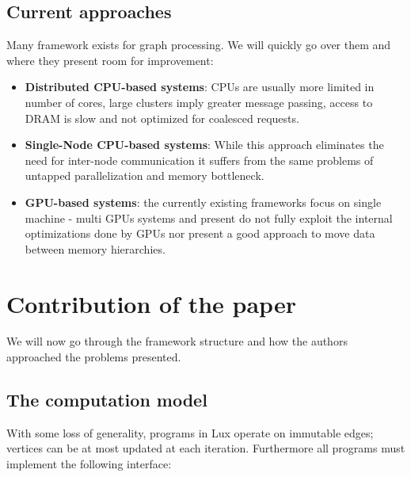 \documentclass[]{article}
\begin{document}
\subsection{Current approaches}
Many framework exists for graph processing. We will quickly go over them and where they present room for improvement:
\begin{itemize}
	\item \textbf{Distributed CPU-based systems}: CPUs are usually more limited in number of cores, large clusters imply greater message passing, access to DRAM is slow and not optimized for coalesced requests.
	\item \textbf{Single-Node CPU-based systems}: While this approach eliminates the need for inter-node communication it suffers from the same problems of untapped parallelization and memory bottleneck.
	\item \textbf{GPU-based systems}: the currently existing frameworks focus on single machine - multi GPUs systems and present do not fully exploit the internal optimizations done by GPUs nor present a good approach to move data between memory hierarchies.
\end{itemize}
 
 \section{Contribution of the paper}
 We will now go through the framework structure and how the authors approached the problems presented.
 \subsection{The computation model}
 
With some loss of generality, programs in Lux operate on immutable edges; vertices can be at most updated at each iteration. Furthermore all programs must implement the following interface:
 
\end{document}
